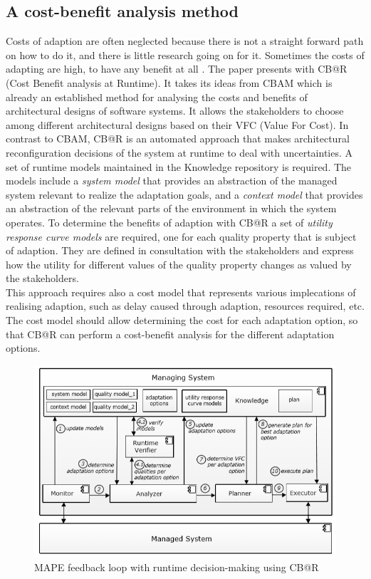 \documentclass[pdftex,english,oribibl]{llncs}
\begin{document}
\subsection{A cost-benefit analysis method}
Costs of adaption are often neglected because there is not a straight forward path on how to do it, and there is little research going on for it. Sometimes the costs of adapting are high, to have any benefit at all \citep{toAdaptNotToAdapt}.
 The paper \cite{decisionMakingSASystems}  presents with CB@R (Cost Benefit analysis at Runtime). It takes its ideas from CBAM which is already an established method for analysing the costs and benefits of architectural designs of software systems. It allows the stakeholders to choose among different architectural designs based on their VFC (Value For Cost). In contrast to CBAM, CB@R is an automated approach that makes architectural reconfiguration decisions of the system at runtime to deal with uncertainties. A set of runtime models maintained in
the Knowledge repository is required. The models include a
\textit{system model} that provides an abstraction of the managed system relevant to
realize the adaptation goals, and a \textit{context model} that provides an abstraction
of the relevant parts of the environment in which the system operates. To determine the benefits of adaption with CB@R a set of \textit{utility response curve models} are required, one for each quality property that is subject of adaption.  They are defined in consultation with the stakeholders and express how the utility for different values of the quality property changes as valued by the stakeholders.\\
This approach requires also a cost model that represents various implecations of realising adaption, such as delay caused through adaption, resources required, etc. The cost model should allow determining the cost for
each adaptation option, so that CB@R can perform a cost-benefit analysis for
the different adaptation options.
  \begin{figure}[H]
\centering
	\includegraphics[totalheight=6cm]{figures/cb@r}
    \caption{MAPE feedback loop with runtime decision-making using CB@R \cite{decisionMakingSASystems}}
    \label{fig:cb@r}
\end{figure}
\end{document}
